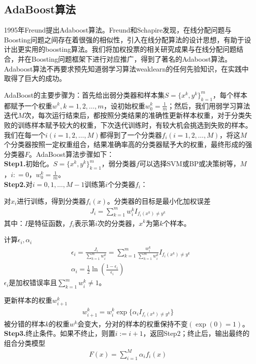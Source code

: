     \subsection{AdaBoost算法}
        \par
        1995年Freund\cite{1995.Yoav}提出Adaboost算法。Freund和Schapire发现，在线分配问题与Boosting问题之间存在着很强的相似性，引入在线分配算法的设计思想，有助于设计出更实用的boosting算法。我们将加权投票的相关研究成果与在线分配问题结合，并在Boosting问题框架下进行对应推广，得到了著名的Adaboost算法。Adaboost算法不再要求预先知道弱学习算法weaklearn的任何先验知识，在实践中取得了巨大的成功。
        \par
        AdaBoost的主要步骤为：首先给出弱分类器和样本集$S = \{x^k,y^k\}_{k=1}^m$，每个样本都赋予一个权重$w^k,k=1,2,\dots,m$，设初始权重$w^k_0 = \frac{1}{m}$；然后，我们用弱学习算法迭代$M$次，每次运行结束后，都按照分类结果的准确性更新样本权重，对于分类失败的训练样本赋予较大的权重，下次迭代训练时，有较大机会挑选到失败的样本。我们在每一个$i(i=1,2,\dots,M)$都得到了一个分类器$f_i(i=1,2,\dots,M)$，将这$M$个分类器按照一定权重组合，结果准确率高的分类器赋予大的权重，最终形成的强分类器$F$。AdaBoost算法步骤如下：\\
        \textbf{Step1.}初始化。$S=\{x^k,y^k\}_{k=1}^m$，弱分类器$f$可以选择SVM或BP或决策树等，$M$，$i: = 0$，$w^k_0 = \frac{1}{m}$。\\
        \textbf{Step2.}对$i=0,1,\dots,M-1$训练第$i$个分类器$f_i$：
        \par
        对$x_i$进行训练，得到分类器$f_i(x)$。分类器的目标是最小化加权误差
        \begin{align*}
        J_i = \sum_{k=1}^m w^k_i I_{f_i(x^k) \neq y^k}
        \end{align*}
        其中：$I$是特征函数，$f_i$表示第$i$次的分类器，$x^k$为第$k$个样本。
        \par
        计算$\epsilon_i,\alpha_i$
        \begin{align*}
        & \epsilon_i = \frac{J_i}{\sum_{k=1}^m w_i^k} = \sum_{k=1}^m \frac{w_i^k}{\sum_{k=1}^m w_i^k} I_{f_i(x^k)\neq y^k}\\
        & \alpha_i = \frac{1}{2}\ln \left( \frac{1-\epsilon_i}{\epsilon_i} \right)
        \end{align*}
        $\epsilon_i$是加权错误率且$\sum_{k=1}^m w_i^k \neq 1$。
        \par
        更新样本的权重$w_{i+1}^k$
        \begin{align*}
        w_{i+1}^k = w_i^k \exp\{\alpha_i I_{f_i(x^k)\neq y^k}\}
        \end{align*}
        被分错的样本$k$的权重$w^k$会变大，分对的样本的权重保持不变$(\exp(0)=1)$。\\
        \textbf{Step3.}终止条件。如果不终止，则置$i:=i+1$，返回Step2；终止后，输出最终的组合分类模型
        \begin{align*}
        F(x) = \sum_{i=1}^M \alpha_i f_i(x)
        \end{align*}

